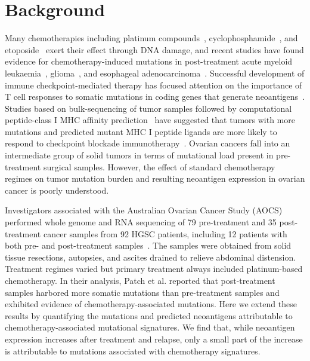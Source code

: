 \section*{Background}

Many chemotherapies including platinum compounds~\cite{Hannan_1989}, cyclophosphamide~\cite{Anderson_1995}, and etoposide~\cite{NAKANOMYO_1986} exert their effect through DNA damage, and recent studies have found evidence for chemotherapy-induced mutations in post-treatment acute myeloid leukaemia~\cite{Ding_2012}, glioma~\cite{Johnson_2013}, and esophageal adenocarcinoma~\cite{Murugaesu_2015}. Successful development of immune checkpoint-mediated therapy\cite{Chen_2013} has focused attention on the importance of T cell responses to somatic mutations in coding genes that generate neoantigens~\cite{Schumacher_2015}. Studies based on bulk-sequencing of tumor samples followed by computational peptide-class I MHC affinity prediction~\cite{Lundegaard_2007} have suggested that tumors with more mutations and predicted mutant MHC I peptide ligands are more likely to respond to checkpoint blockade immunotherapy~\cite{Van_Allen_2015,Rizvi_2015}. Ovarian cancers fall into an intermediate group of solid tumors in terms of mutational load present in pre-treatment surgical samples\cite{Lawrence_2013}. However, the effect of standard chemotherapy regimes on tumor mutation burden and resulting neoantigen expression in ovarian cancer is poorly understood.

Investigators associated with the Australian Ovarian Cancer Study (AOCS) performed whole genome and RNA sequencing of 79 pre-treatment and 35 post-treatment cancer samples from 92 HGSC patients, including 12 patients with both pre- and post-treatment samples~\cite{Patch_2015}. The samples were obtained from solid tissue resections, autopsies, and ascites drained to relieve abdominal distension. Treatment regimes varied but primary treatment always included platinum-based chemotherapy. In their analysis, Patch et al. reported that post-treatment samples harbored more somatic mutations than pre-treatment samples and exhibited evidence of chemotherapy-associated mutations. Here we extend these results by quantifying the mutations and predicted neoantigens attributable to chemotherapy-associated mutational signatures. We find that, while neoantigen expression increases after treatment and relapse, only a small part of the increase is attributable to mutations associated with chemotherapy signatures.



